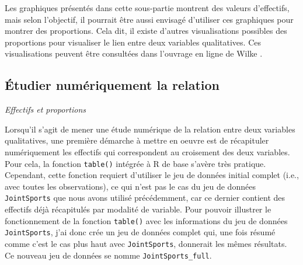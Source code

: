 \documentclass[
  french,
]{book}
\begin{document}
Les graphiques présentés dans cette sous-partie montrent des valeurs d'effectifs, mais selon l'objectif, il pourrait être aussi envisagé d'utiliser ces graphiques pour montrer des proportions. Cela dit, il existe d'autres visualisations possibles des proportions pour visualiser le lien entre deux variables qualitatives. Ces visualisations peuvent être consultées dans l'ouvrage en ligne de Wilke \autocite*{wilkeFundamentalsDataVisualization2018}.

\hypertarget{uxe9tudier-numuxe9riquement-la-relation-1}{%
\subsection{Étudier numériquement la relation}\label{uxe9tudier-numuxe9riquement-la-relation-1}}

\emph{Effectifs et proportions}

Lorsqu'il s'agit de mener une étude numérique de la relation entre deux variables qualitatives, une première démarche à mettre en oeuvre est de récapituler numériquement les effectifs qui correspondent au croisement des deux variables. Pour cela, la fonction \texttt{table()} intégrée à R de base s'avère très pratique. Cependant, cette fonction requiert d'utiliser le jeu de données initial complet (i.e., avec toutes les observations), ce qui n'est pas le cas du jeu de données \texttt{JointSports} que nous avons utilisé précédemment, car ce dernier contient des effectifs déjà récapitulés par modalité de variable. Pour pouvoir illustrer le fonctionnement de la fonction \texttt{table()} avec les informations du jeu de données \texttt{JointSports}, j'ai donc crée un jeu de données complet qui, une fois résumé comme c'est le cas plus haut avec \texttt{JointSports}, donnerait les mêmes résultats. Ce nouveau jeu de données se nomme \texttt{JointSports\_full}.
\end{document}
